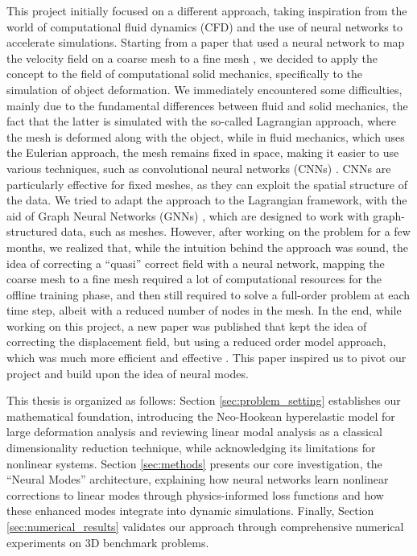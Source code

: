 This project initially focused on a different approach, taking inspiration from the world of computational fluid dynamics (CFD) and the use of neural networks to accelerate simulations. Starting from a paper that used a neural network to map the velocity field on a coarse mesh to a fine mesh \cite{kienerDatadrivenCorrectionCoarse2023}, we decided to apply the concept to the field of computational solid mechanics, specifically to the simulation of object deformation. We immediately encountered some difficulties, mainly due to the fundamental differences between fluid and solid mechanics, the fact that the latter is simulated with the so-called Lagrangian approach, where the mesh is deformed along with the object, while in fluid mechanics, which uses the Eulerian approach, the mesh remains fixed in space, making it easier to use various techniques, such as convolutional neural networks (CNNs) \cite{journals/corr/OSheaN15}. CNNs are particularly effective for fixed meshes, as they can exploit the spatial structure of the data. We tried to adapt the approach to the Lagrangian framework, with the aid of Graph Neural Networks (GNNs) \cite{kipf2017semisupervisedclassificationgraphconvolutional}, which are designed to work with graph-structured data, such as meshes. However, after working on the problem for a few months, we realized that, while the intuition behind the approach was sound, the idea of correcting a ``quasi'' correct field with a neural network, mapping the coarse mesh to a fine mesh required a lot of computational resources for the offline training phase, and then still required to solve a full-order problem at each time step, albeit with a reduced number of nodes in the mesh. In the end, while working on this project, a new paper was published that kept the idea of correcting the displacement field, but using a reduced order model approach, which was much more efficient and effective \cite{Wang_Du_Coros_Thomaszewski_2024}. This paper inspired us to pivot our project and build upon the idea of neural modes.



This thesis is organized as follows: Section \ref{sec:problem_setting} establishes our mathematical foundation, introducing the Neo-Hookean hyperelastic model for large deformation analysis and reviewing linear modal analysis as a classical dimensionality reduction technique, while acknowledging its limitations for nonlinear systems. Section \ref{sec:methods} presents our core investigation, the ``Neural Modes'' architecture, explaining how neural networks learn nonlinear corrections to linear modes through physics-informed loss functions and how these enhanced modes integrate into dynamic simulations. Finally, Section \ref{sec:numerical_results} validates our approach through comprehensive numerical experiments on 3D benchmark problems.


